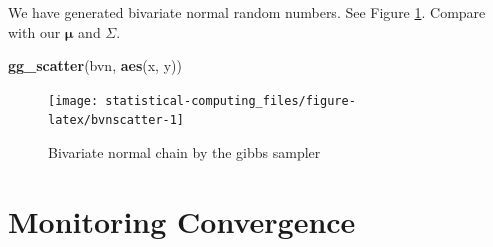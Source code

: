 \documentclass[]{book}
\newenvironment{Shaded}{\begin{snugshade}}{\end{snugshade}}
\newcommand{\KeywordTok}[1]{\textcolor[rgb]{0.13,0.29,0.53}{\textbf{#1}}}
\newcommand{\NormalTok}[1]{#1}
\theoremstyle{definition}
\theoremstyle{definition}
\theoremstyle{definition}
\theoremstyle{remark}
\begin{document}
We have generated bivariate normal random numbers. See Figure \ref{fig:bvnscatter}. Compare with our \(\boldsymbol\mu\) and \(\Sigma\).

\begin{Shaded}
\begin{Highlighting}[]
\KeywordTok{gg_scatter}\NormalTok{(bvn, }\KeywordTok{aes}\NormalTok{(x, y))}
\end{Highlighting}
\end{Shaded}

\begin{figure}[H]

{\centering \texttt{[image: statistical-computing\_files/figure-latex/bvnscatter-1]} 

}

\caption{Bivariate normal chain by the gibbs sampler}\label{fig:bvnscatter}
\end{figure}

\hypertarget{monitoring-convergence}{%
\section{Monitoring Convergence}\label{monitoring-convergence}}


\end{document}
